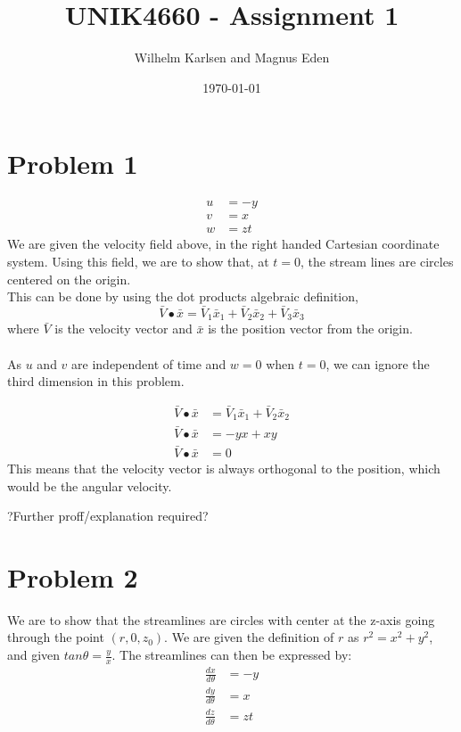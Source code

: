 \documentclass[11pt,a4paper,english]{article}
\title{UNIK4660 - Assignment 1}
\author{Wilhelm Karlsen and Magnus Eden}
\date{\today}
\numberwithin{equation}{section}
\begin{document}
\maketitle

\section{Problem 1}
\begin{align}
	u &= -y \nonumber \\
	v &=  x \nonumber \\
	w &= zt \nonumber
\end{align}
We are given the velocity field above, in the right handed Cartesian coordinate system. Using this field, we are to show that, at $t = 0$, the stream lines are circles centered on the origin. 
\\
This can be done by using the dot products algebraic definition,
$$ \bar{V} \bullet \bar{x} = \bar{V}_{1}\bar{x}_{1} + \bar{V}_{2}\bar{x}_{2} + \bar{V}_{3}\bar{x}_{3}$$
where $\bar{V}$ is the velocity vector and $\bar{x}$ is the position vector from the origin.
\\
\\
As $u$ and $v$ are independent of time and $w = 0$ when $t = 0$, we can ignore the third dimension in this problem.

\begin{align*}
	\bar{V} \bullet \bar{x} &= \bar{V}_{1}\bar{x}_{1} + \bar{V}_{2}\bar{x}_{2}	\\
	\bar{V} \bullet \bar{x} &= -yx + xy	\\
	\bar{V} \bullet \bar{x} &= 0
\end{align*}
This means that the velocity vector is always orthogonal to the position, which would be the angular velocity.

?Further proff/explanation required?


\section{Problem 2}
We are to show that the streamlines are circles with center at the z-axis going through the point $(r, 0, z_{0})$.
We are given the definition of $r$ as $r^2 = x^2 + y^2$, and given $tan \theta = \frac{y}{x}$.
The streamlines can then be expressed by:
\begin{align}
	\frac{dx}{d\theta} &= -y \nonumber \\
	\frac{dy}{d\theta} &=  x \nonumber \\
	\frac{dz}{d\theta} &= zt \nonumber
\end{align}
\end{document}
